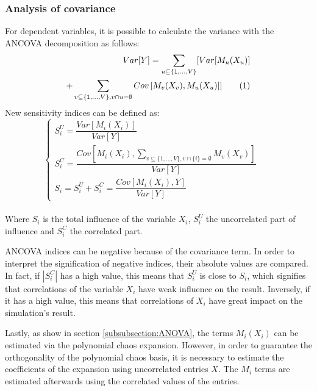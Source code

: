 \subsubsection{Analysis of covariance}
\label{subsubsection:ANCOVA}
For dependent variables, it is possible to calculate the variance with the ANCOVA decomposition as follows:
\begin{align*}
Var[Y] =
\sum_{u \subseteq \{1,...,V\}} [ Var[M_u(X_u)]\\
+ \sum_{v \subseteq \{1,...,V\}, v \cap u = \emptyset} Cov\left[M_v(X_v), M_u(X_u)\right] ] \addtocounter{equation}{1}\tag{\theequation}
\end{align*}
New sensitivity indices can be defined as:
\begin{equation}
\left\{
	\begin{array}{lcr}
S_i^U= \dfrac{Var\left[M_i(X_i)\right]}{Var[Y]} & & \\
S_i^C= \dfrac{Cov\left[M_i(X_i),\sum_{v \subseteq \{1,...,V\}, v \cap \{i\} = \emptyset} M_v(X_v)\right]}{Var[Y]} & & \\
S_i= S_i^U + S_i^C = \dfrac{Cov\left[M_i(X_i),Y\right]}{Var[Y]} & &
	\end{array}
\right.
\end{equation}
\\
Where $S_i$ is the total influence of the variable $X_i$, $S_i^U$ the uncorrelated part of influence and $S_i^C$ the correlated part.

ANCOVA indices can be negative because of the covariance term. In order to interpret the signification of negative indices, their absolute values are compared. In fact, if $|S_i^C|$ has a high value, this means that $S_i^U$ is close to $S_i$, which signifies that correlations of the variable $X_i$ have weak influence on the result. Inversely, if it has a high value, this means that correlations of $X_i$ have great impact on the simulation's result.

Lastly, as show in section \ref{subsubsection:ANOVA}, the terms $M_i(X_i)$ can be estimated via the polynomial chaos expansion. However, in order to guarantee the orthogonality of the polynomial chaos basis, it is necessary to estimate the coefficients of the expansion using uncorrelated entries $X$. The $M_i$ terms are estimated afterwards using the correlated values of the entries. 


